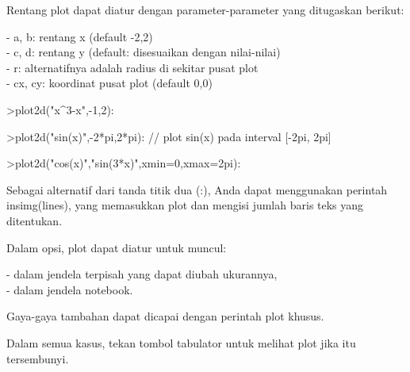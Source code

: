 \documentclass[a4paper,10pt]{article}
\begin{document}
\begin{eulernotebook}
\begin{eulercomment}
\begin{eulercomment}
\begin{eulercomment}
\begin{eulercomment}
\begin{eulercomment}
\begin{eulercomment}
\begin{eulercomment}
Rentang plot dapat diatur dengan parameter-parameter yang ditugaskan
berikut:

- a, b: rentang x (default -2,2)\\
- c, d: rentang y (default: disesuaikan dengan nilai-nilai)\\
- r: alternatifnya adalah radius di sekitar pusat plot\\
- cx, cy: koordinat pusat plot (default 0,0)
\end{eulercomment}
\begin{eulerprompt}
>plot2d("x^3-x",-1,2):
\end{eulerprompt}
\begin{eulerprompt}
>plot2d("sin(x)",-2*pi,2*pi): // plot sin(x) pada interval [-2pi, 2pi]
\end{eulerprompt}
\begin{eulerprompt}
>plot2d("cos(x)","sin(3*x)",xmin=0,xmax=2pi):
\end{eulerprompt}
\begin{eulercomment}
Sebagai alternatif dari tanda titik dua (:), Anda dapat menggunakan
perintah insimg(lines), yang memasukkan plot dan mengisi jumlah baris
teks yang ditentukan.

Dalam opsi, plot dapat diatur untuk muncul:

- dalam jendela terpisah yang dapat diubah ukurannya,\\
- dalam jendela notebook.

Gaya-gaya tambahan dapat dicapai dengan perintah plot khusus.

Dalam semua kasus, tekan tombol tabulator untuk melihat plot jika itu
tersembunyi.


\end{eulercomment}
\end{eulercomment}
\end{eulercomment}
\end{eulercomment}
\end{eulercomment}
\end{eulercomment}
\end{eulercomment}
\end{eulernotebook}
\end{document}
